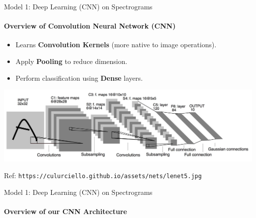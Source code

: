 \documentclass{beamer}
\begin{document}
\begin{frame}{Model 1: Deep Learning (CNN) on Spectrograms}
  \framesubtitle{Overview of Convolution Neural Network (CNN)}

  \begin{block}{}
    \begin{itemize}
    \item Learns \textbf{Convolution Kernels} (more native to image operations).
    \item Apply \textbf{Pooling} to reduce dimension.
    \item Perform classification using \textbf{Dense} layers.
    \end{itemize}
  \end{block}
  
  \begin{center}
    \includegraphics[scale=0.15]{img/cnn_gen.jpg}

    Ref: \texttt{https://culurciello.github.io/assets/nets/lenet5.jpg}
  \end{center}

\end{frame}



\begin{frame}{Model 1: Deep Learning (CNN) on Spectrograms}
  \framesubtitle{Overview of our CNN Architecture}
  
\end{frame}
\end{document}
